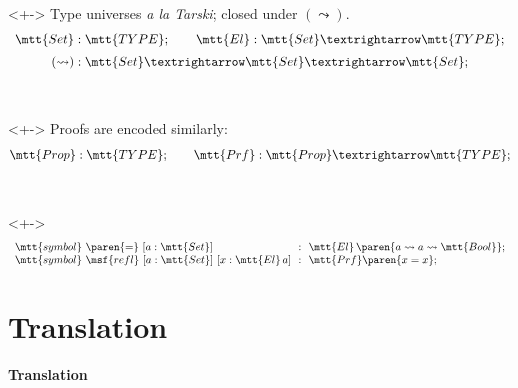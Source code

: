 \documentclass[handout, lualatex, compress, 12pt-------------------------------------------------------------------------------------------------------------]{beamer}
\begin{document}
\begin{frame}
	\begin{uncoverenv}<+->%
		\alert{Type universes} \emph{a la Tarski}; closed under $({\leadsto})$.
		$$
			\begin{array}{c}
				\mtt{Set} : \mtt{TYPE};            \qquad
				\mtt{El} : \mtt{Set} → \mtt{TYPE}; \\[2mm]
				(\leadsto) : \mtt{Set} → \mtt{Set} → \mtt{Set};
			\end{array}
		$$
	\end{uncoverenv}
	\\
	\begin{uncoverenv}<+->%
		Proofs are encoded similarly:
		$$
			\mtt{Prop} : \mtt{TYPE}; \qquad \mtt{Prf} : \mtt{Prop} → \mtt{TYPE};
		$$
	\end{uncoverenv}
	\\
	\begin{uncoverenv}<+->
		\exxample%
		$$
			\begin{array}{l@{\ \ :\ \ }l}
				\mtt{symbol}\ \paren{{=}}\ [a : \mtt{Set}]                   & \mtt{El}\,\paren{a \leadsto a \leadsto \mtt{Bool}};
				\\
				\mtt{symbol}\ \msf{refl}\ [a : \mtt{Set}]\ [x : \mtt{El}\,a] &
				\mtt{Prf}\paren{x = x};
			\end{array}
		$$
	\end{uncoverenv}
\end{frame}

\section{Translation}

\begin{frame}[standout]
	\centering\Huge
	\textbf{Translation}
\end{frame}

\newcommand{\tra}[1]{\llbracket\,#1\,\rrbracket}
\newcommand{\ki}[1]{{\tra{#1}}_{\mbf{ki}}}
\newcommand{\ty}[1]{{\tra{#1}}_{\mbf{ty}}}
\newcommand{\tm}[1]{{\tra{#1}}_{\mbf{tm}}}
\newcommand{\rawapp}[2]{\paren{\mtt{\_}\ {#1}\ {#2}}}
\end{document}
